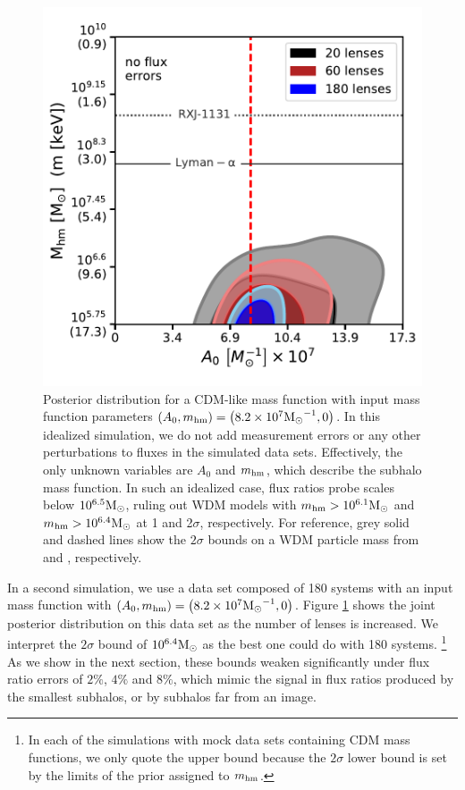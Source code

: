 \begin{figure}
	\centering
	\includegraphics[clip,trim=0cm .5cm .3cm
	.5cm,width=.8\textwidth,keepaspectratio]{./figures_ABCforward/joint_varynlens_noerrors.pdf}
	\caption{\label{fig:cdm_inf_noerror} Posterior distribution for a CDM-like mass function with input mass function parameters $\left(A_0,m_{\rm{hm}}\right) = \left(8.2 \times 10^7 {\rm{M}_{\odot}}^{-1},0\right)$. In this idealized simulation, we do not add measurement errors or any other perturbations to fluxes in the simulated data sets. Effectively, the only unknown variables are $A_0$ and $m_{\rm{hm}}$, which describe the subhalo mass function. In such an idealized case, flux ratios probe scales below $10^{6.5} {\rm{M}_{\odot}}$, ruling out WDM models with $m_{\rm{hm}} > 10^{6.1} {\rm{M}_{\odot}}$ and $m_{\rm{hm}} > 10^{6.4}{\rm{M}_{\odot}}$ at 1 and 2$\sigma$, respectively. For reference, grey solid and dashed lines show the $2\sigma$ bounds on a WDM particle mass from \cite{Viel13} and \cite{Birrer++17a}, respectively.}
\end{figure}

In a second simulation, we use a data set composed of 180 systems with an input mass function with $\left(A_0,m_{\rm{hm}}\right) = \left(8.2\times 10^7 {\rm{M}_{\odot}}^{-1},0 \right)$. Figure \ref{fig:cdm_inf_noerror} shows the joint posterior distribution on this data set as the number of lenses is increased. We interpret the $2 \sigma$ bound of $10^{6.4} {\rm{M}_{\odot}}$ as the best one could do with 180 systems. \footnote{In each of the simulations with mock data sets containing CDM mass functions, we only quote the upper bound because the $2 \sigma$ lower bound is set by the limits of the prior assigned to $m_{\rm{hm}}$.} As we show in the next section, these bounds weaken significantly under flux ratio errors of $2\%$, $4\%$ and $8\%$, which mimic the signal in flux ratios produced by the smallest subhalos, or by subhalos far from an image.

